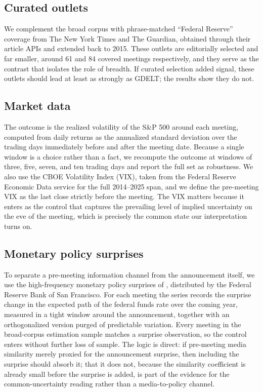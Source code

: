 \documentclass[11pt,a4paper]{article}
\begin{document}
\subsection{Curated outlets}

We complement the broad corpus with phrase-matched ``Federal Reserve'' coverage
from The New York Times and The Guardian, obtained through their article APIs and
extended back to 2015. These outlets are editorially selected and far smaller,
around 61 and 84 covered meetings respectively, and they serve as the contrast
that isolates the role of breadth. If curated selection added signal, these
outlets should lead at least as strongly as GDELT; the results show they do not.

\subsection{Market data}

The outcome is the realized volatility of the S\&P 500 around each meeting,
computed from daily returns as the annualized standard deviation over the trading
days immediately before and after the meeting date. Because a single window is a
choice rather than a fact, we recompute the outcome at windows of three, five,
seven, and ten trading days and report the full set as robustness. We also use the
CBOE Volatility Index (VIX), taken from the Federal Reserve Economic Data service
for the full 2014--2025 span, and we define the pre-meeting VIX as the last close
strictly before the meeting. The VIX matters because it enters as the control that
captures the prevailing level of implied uncertainty on the eve of the meeting,
which is precisely the common state our interpretation turns on.

\subsection{Monetary policy surprises}

To separate a pre-meeting information channel from the announcement itself, we use
the high-frequency monetary policy surprises of \citet{bauer2023reassessment},
distributed by the Federal Reserve Bank of San Francisco. For each meeting the
series records the surprise change in the expected path of the federal funds rate
over the coming year, measured in a tight window around the announcement, together
with an orthogonalized version purged of predictable variation. Every meeting in
the broad-corpus estimation sample matches a surprise observation, so the control
enters without further loss of sample. The logic is direct: if pre-meeting media
similarity merely proxied for the announcement surprise, then including the
surprise should absorb it; that it does not, because the similarity coefficient is
already small before the surprise is added, is part of the evidence for the
common-uncertainty reading rather than a media-to-policy channel.
\end{document}
